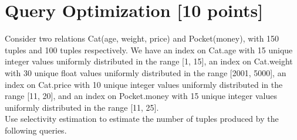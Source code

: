 \documentclass[10pt]{article}
\begin{document}
\section{Query Optimization \textbf{[10 points]}}
Consider two relations Cat(age, weight, price) and Pocket(money), with 150 tuples and 100 tuples respectively.
We have an index on Cat.age with 15 unique integer values uniformly distributed in the range [1, 15],
an index on Cat.weight with 30 unique float values uniformly distributed in the range [2001, 5000],
an index on Cat.price with 10 unique integer values uniformly distributed in the range [11, 20],
and an index on Pocket.money with 15 unique integer values uniformly distributed in the range [11, 25]. \\
Use selectivity estimation to estimate the number of tuples produced by the following queries.
\end{document}
